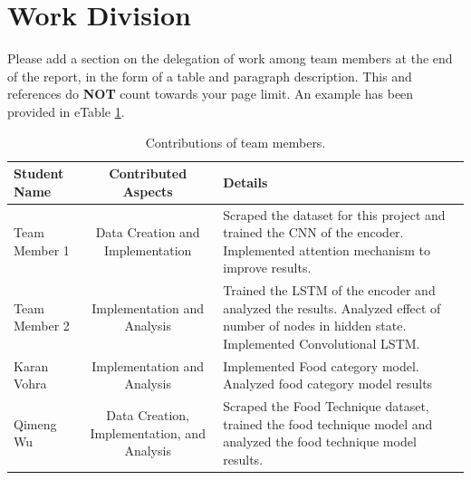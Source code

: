 \documentclass[10pt,twocolumn,letterpaper]{article}
\begin{document}




\section{Work Division}

Please add a section on the delegation of work among team members at the end of the report, in the form of a table and paragraph description. This and references do \textbf{NOT} count towards your page limit. An example has been provided in eTable \ref{tab:contributions}.

\begin{table}
\begin{center}
\begin{tabular}{|l|c|p{8cm}|}
\hline
Student Name & Contributed Aspects & Details \\
\hline\hline
Team Member 1 & Data Creation and Implementation & Scraped the dataset for this project and trained the CNN of the encoder. Implemented attention mechanism to improve results. \\
Team Member 2 & Implementation and Analysis & Trained the LSTM of the encoder and analyzed the results. Analyzed effect of number of nodes in hidden state.  Implemented Convolutional LSTM. \\
Karan Vohra & Implementation and Analysis & Implemented Food category model. Analyzed food category model results \\
Qimeng Wu & Data Creation, Implementation, and Analysis & Scraped the Food Technique dataset, trained the food technique model and analyzed the food technique model results.
\end{tabular}
\end{center}
\caption{Contributions of team members.}
\label{tab:contributions}
\end{table}


\newpage
\newpage


{\small


}
\end{document}
